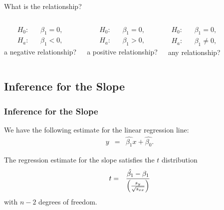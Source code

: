 \begin{frame}{What is the relationship?}


    \begin{columns}

      \begin{eqnarray*}
        H_0: & & \beta_1=0, \\
        H_a: & & \beta_1<0,
      \end{eqnarray*}
      a negative relationship?


      \begin{eqnarray*}
        H_0: & & \beta_1=0, \\
        H_a: & & \beta_1>0,
      \end{eqnarray*}
      a positive relationship?



      \begin{eqnarray*}
        H_0: & & \beta_1=0, \\
        H_a: & & \beta_1\neq 0,
      \end{eqnarray*}
      any relationship?

      
    \end{columns}

  
\end{frame}

\subsection{Inference for the Slope}

\begin{frame}
  \frametitle{Inference for the Slope}

  We have the following estimate for the linear regression line:
  \begin{eqnarray*}
    y & = & \hat{\beta_1} x + \hat{\beta_0}.
  \end{eqnarray*}

  \begin{definition}
    The regression estimate for the slope satisfies the $t$ distribution
    \begin{eqnarray*}
      t & = & \frac{\hat{\beta_1}-\beta_1}{\left(\frac{s_y}{\sqrt{s_{xx}}}\right)}
    \end{eqnarray*}
    with $n-2$ degrees of freedom.
  \end{definition}

\end{frame}


